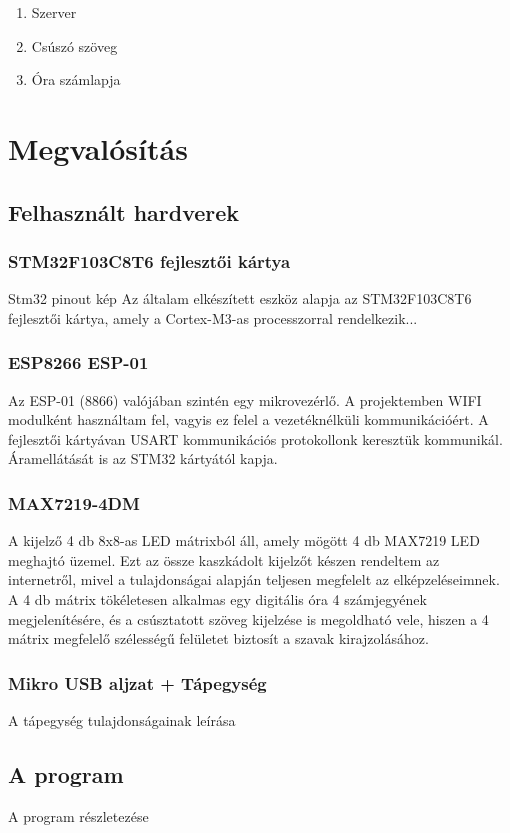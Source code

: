 \documentclass[a4paper, 12pt]{article}
\begin{document}
\begin{enumerate}
	\item Szerver
	\item Csúszó szöveg
	\item Óra számlapja
\end{enumerate}

\section{Megvalósítás}
\subsection{Felhasznált hardverek}
\subsubsection{STM32F103C8T6 fejlesztői kártya}
Stm32 pinout kép
Az általam elkészített eszköz alapja az STM32F103C8T6 fejlesztői kártya, amely a Cortex-M3-as processzorral rendelkezik...

\subsubsection{ESP8266 ESP-01}
Az ESP-01 (8866) valójában szintén egy mikrovezérlő. A projektemben WIFI modulként használtam fel, vagyis ez felel a vezetéknélküli kommunikációért. A fejlesztői kártyávan USART kommunikációs protokollonk keresztük kommunikál. Áramellátását is az STM32 kártyától kapja. 

\subsubsection{MAX7219-4DM}
A kijelző 4 db 8x8-as LED mátrixból áll, amely mögött 4 db MAX7219 LED meghajtó üzemel. Ezt az össze kaszkádolt kijelzőt készen rendeltem az internetről, mivel a tulajdonságai alapján teljesen megfelelt az elképzeléseimnek. A 4 db mátrix tökéletesen alkalmas egy digitális óra 4 számjegyének megjelenítésére, és a csúsztatott szöveg kijelzése is megoldható vele, hiszen a 4 mátrix megfelelő szélességű felületet biztosít a szavak kirajzolásához.

\subsubsection{Mikro USB aljzat + Tápegység}
A tápegység tulajdonságainak leírása

\subsection{A program}
A program részletezése
\end{document}
